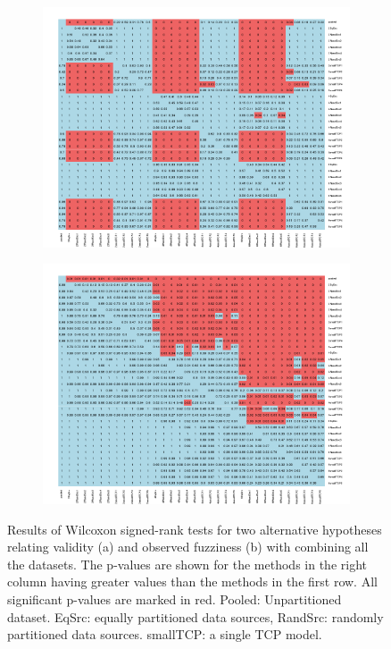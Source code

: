 \documentclass[main]{subfiles}
\begin{document}
\begin{figure}[H]
\centering
\begin{subfigure}{\textwidth}
  \centering
  \includegraphics[width=.75\linewidth]{images/heatmapCombined}
\end{subfigure}%

\begin{subfigure}{\textwidth}
  \centering
  \includegraphics[width=.75\linewidth]{images/heatmapCombined_eff}
\end{subfigure}%
\caption{Results of Wilcoxon signed-rank tests for two alternative hypotheses relating validity (a) and observed fuzziness (b) with combining all the datasets. The p-values are shown for the methods in the right column having greater values than the methods in the first row. All significant p-values are marked in red. Pooled: Unpartitioned dataset. EqSrc: equally partitioned data sources, RandSrc: randomly partitioned data sources. smallTCP: a single TCP model.} \label{fig:testCombined}
\end{figure}
\end{document}
